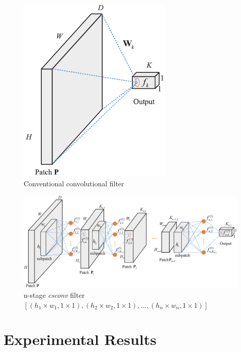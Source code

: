 \begin{figure}[h!]
    \centering
    \includegraphics[scale=0.6]{images/01_1.png}
    \caption{Conventional convolutional filter}
    \label{fig:01_1}
\end{figure}

\FloatBarrier

\begin{figure}[h!]
    \centering
    \includegraphics[scale=0.50]{images/01_2.png}
    \caption{n-stage \textit{csconv} filter $[(h_1 \times w_1, 1 \times 1), (h_2 \times w_2, 1 \times 1), ..., (h_n \times w_n, 1 \times 1)]$}
    \label{fig:01_2}
\end{figure}

\FloatBarrier

\section{Experimental Results}

